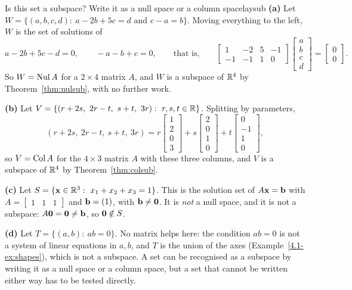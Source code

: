 \documentclass[11pt]{article}
\begin{document}
\begin{exmp}{Is this set a subspace? Write it as a null space or a column space}{laysub}
\textbf{(a)} Let $W=\{(a,b,c,d):\ a-2b+5c=d\text{ and }c-a=b\}$. Moving everything to the left, $W$ is the set of solutions of
\[
a-2b+5c-d=0,\qquad -a-b+c=0,\qquad\text{that is,}\qquad \begin{bmatrix}1&-2&5&-1\\-1&-1&1&0\end{bmatrix}\begin{bmatrix}a\\b\\c\\d\end{bmatrix}=\begin{bmatrix}0\\0\end{bmatrix}.
\]
So $W=\operatorname{Nul} A$ for a $2\times4$ matrix $A$, and $W$ is a subspace of $\mathbb{R}^4$ by Theorem~\ref{thm:nulsub}, with no further work.

\textbf{(b)} Let $V=\{(r+2s,\ 2r-t,\ s+t,\ 3r):\ r,s,t\in\R\}$. Splitting by parameters,
\[
(r+2s,\ 2r-t,\ s+t,\ 3r)=r\begin{bmatrix}1\\2\\0\\3\end{bmatrix}+s\begin{bmatrix}2\\0\\1\\0\end{bmatrix}+t\begin{bmatrix}0\\-1\\1\\0\end{bmatrix},
\]
so $V=\operatorname{Col} A$ for the $4\times3$ matrix $A$ with these three columns, and $V$ is a subspace of $\mathbb{R}^4$ by Theorem~\ref{thm:colsub}.

\textbf{(c)} Let $S=\{\mathbf{x}\in\mathbb{R}^3:\ x_1+x_2+x_3=1\}$. This is the solution set of $A\mathbf{x}=\mathbf{b}$ with $A=\begin{bmatrix}1&1&1\end{bmatrix}$ and $\mathbf{b}=(1)$, with $\mathbf{b}\neq\mathbf{0}$. It is \emph{not} a null space, and it is not a subspace: $A\mathbf{0}=\mathbf{0}\neq\mathbf{b}$, so $\mathbf{0}\notin S$.

\textbf{(d)} Let $T=\{(a,b):\ ab=0\}$. No matrix helps here: the condition $ab=0$ is not a system of linear equations in $a,b$, and $T$ is the union of the axes (Example~\ref{4.1-ex:shapes}), which is not a subspace. A set can be recognised as a subspace by writing it as a null space or a column space, but a set that cannot be written either way has to be tested directly.
\end{exmp}
\end{document}
